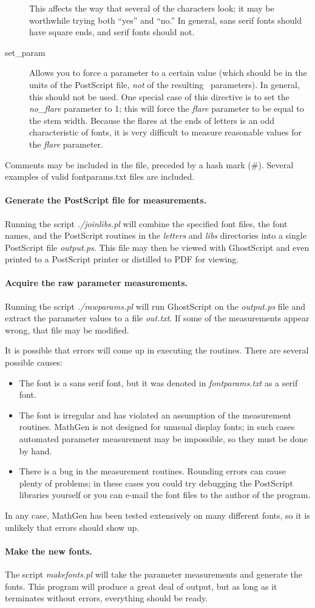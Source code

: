 \begin{description}
This affects the way that several of the characters look; it may be worthwhile
trying both ``yes'' and ``no.'' In general, sans serif fonts should have square
ends, and serif fonts should not.
\item[set\_param] Allows you to force a parameter to a certain value (which
should be in the units of the PostScript file, \emph{not} of the resulting \MF\
parameters). In general, this should not be used. One special case of this
directive is to set the \emph{no\_flare} parameter to 1; this will force the
\emph{flare} parameter to be equal to the stem width. Because the flares at the
ends of letters is an odd characteristic of fonts, it is very difficult to
measure reasonable values for the \emph{flare} parameter.
\end{description}
Comments may be included in the file, preceded by a hash mark (\#). Several
examples of valid fontparams.txt files are included.

\paragraph{Generate the PostScript file for measurements.} Running the script
\emph{./joinlibs.pl} will combine the specified font files, the font names, and
the PostScript routines in the \emph{letters} and \emph{libs} directories into a
single PostScript file \emph{output.ps}. This file may then be viewed with
GhostScript and even printed to a PostScript printer or distilled to PDF for
viewing.

\paragraph{Acquire the raw parameter measurements.} Running the script
\emph{./rawparams.pl} will run GhostScript on the \emph{output.ps} file and
extract the parameter values to a file \emph{out.txt}. If some of the
measurements appear wrong, that file may be modified.

It is possible that errors will come up in executing the routines. There are
several possible causes:
\begin{itemize}
\item The font is a sans serif font, but it was denoted in \emph{fontparams.txt}
as a serif font.
\item The font is irregular and has violated an assumption of the measurement
routines. MathGen is not designed for unusual display fonts; in such cases
automated parameter measurement may be impossible, so they must be done by hand.
\item There is a bug in the measurement routines. Rounding errors can cause
plenty of problems; in these cases you could try debugging the PostScript
libraries yourself or you can e-mail the font files to the author of the
program.
\end{itemize}
In any case, MathGen has been tested extensively on many different fonts, so it
is unlikely that errors should show up.

\paragraph{Make the new fonts.} The script \emph{makefonts.pl} will take the
parameter measurements and generate the fonts. This program will produce a great
deal of output, but as long as it terminates without errors, everything should
be ready.


